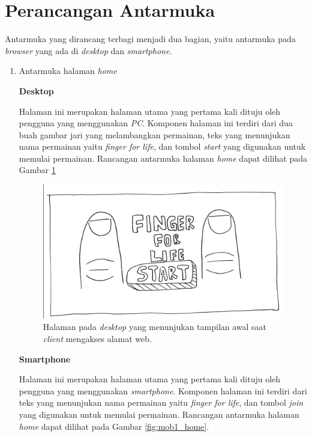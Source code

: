 \section{Perancangan Antarmuka}
\label{sec:antarmuka}

Antarmuka yang dirancang terbagi menjadi dua bagian, yaitu antarmuka pada \textit{browser} yang ada di \textit{desktop} dan \textit{smartphone}.

\begin{enumerate}
	\item Antarmuka halaman \textit{home}
	
	\textbf{Desktop}
	
	Halaman ini merupakan halaman utama yang pertama kali dituju oleh pengguna yang menggunakan \textit{PC}. Komponen halaman ini terdiri dari dua buah gambar jari yang melambangkan permainan, teks yang menunjukan nama permainan yaitu \textit{finger for life}, dan tombol \textit{start} yang digunakan untuk memulai permainan. Rancangan antarmuka halaman \textit{home} dapat dilihat pada Gambar \ref{fig:web1_home}

\begin{figure}[H]
	\centering
	\includegraphics[scale=0.1]{Gambar/web1_home}
	\caption{Halaman pada \textit{desktop} yang menunjukan tampilan awal saat \textit{client} mengakses alamat web.}
	\label{fig:web1_home}
\end{figure}

	\textbf{Smartphone}
	
	Halaman ini merupakan halaman utama yang pertama kali dituju oleh pengguna yang menggunakan \textit{smartphone}. Komponen halaman ini terdiri dari teks yang menunjukan nama permainan yaitu \textit{finger for life}, dan tombol \textit{join} yang digunakan untuk memulai permainan. Rancangan antarmuka halaman \textit{home} dapat dilihat pada Gambar \ref{fig:mob1_home}.
	

\end{enumerate}
